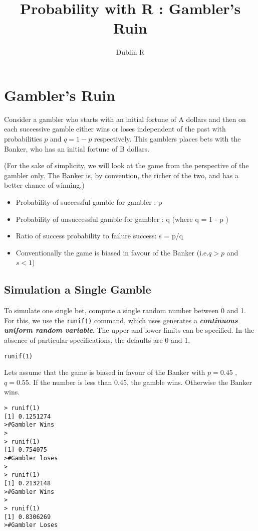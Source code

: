 \documentclass[11pt]{article} %
\title{Probability with R : Gambler's Ruin}
\author{Dublin R}
\begin{document}
\maketitle
\section{Gambler's Ruin}
Consider a gambler who starts with an initial fortune of A dollars and then on each successive gamble
either wins  or loses independent of the past with probabilities $p$ and $q = 1- p$ respectively.
This gamblers places bets with the Banker, who has an initial fortune of B dollars. 

(For the sake of simplicity, we will look at the game from the perspective of the gambler only. The Banker is, by convention, the richer of the two, and has a better chance of winning.)

\begin{itemize}
\item Probability of successful gamble for gambler : p
\item Probability of unsuccessful gamble for gambler : q (where q = 1 - p )
\item Ratio of success probability to failure success: s = p/q
\item Conventionally the game is biased in favour of the Banker (i.e.$ q > p$ and $s < 1$)
\end{itemize}


\subsection{Simulation a Single Gamble}
To simulate one single bet, compute a single random number between 0 and 1. For this, we 
use the \texttt{runif()} command, which uses generates a \textbf{\textit{continuous uniform random variable}}. The upper and lower limits can be specified. In the absence of particular specifications, the defaults are 0 and 1.
\begin{framed}
\begin{verbatim}
runif(1)
\end{verbatim}
\end{framed}
Lets assume that the game is biased in favour of the Banker with $p = 0.45$ ,$q = 0.55$. If the
number is less than 0.45, the gamble wins. Otherwise the Banker wins.
\begin{verbatim}
> runif(1)
[1] 0.1251274
>#Gambler Wins
>
> runif(1)
[1] 0.754075
>#Gambler loses
>
> runif(1)
[1] 0.2132148
>#Gambler Wins
>
> runif(1)
[1] 0.8306269
>#Gambler Loses
\end{verbatim}
\newpage
\end{document}
